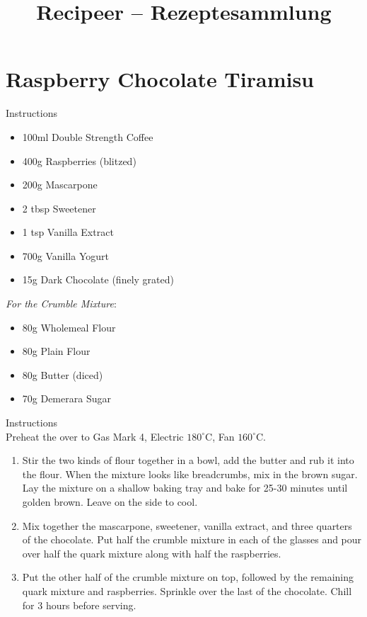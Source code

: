 \documentclass[11pt,a4paper,german]{article} %
\title{Recipeer -- Rezeptesammlung}
\begin{document}
\maketitle
\newpage

\tableofcontents

\newpage
\section{Raspberry Chocolate Tiramisu}
\lhead{}
\begin{multicols}{2}
{\Large Instructions}
\begin{itemize}
    \item 100ml Double Strength Coffee
    \item 400g Raspberries (blitzed)
    \item 200g Mascarpone
    \item 2 tbsp Sweetener
    \item 1 tsp Vanilla Extract
    \item 700g Vanilla Yogurt
    \item 15g Dark Chocolate (finely grated)
\end{itemize}
\columnbreak
\textit{For the Crumble Mixture}:
\begin{itemize}
    \item 80g Wholemeal Flour
    \item 80g Plain Flour
    \item 80g Butter (diced)
    \item 70g Demerara Sugar
\end{itemize}
\end{multicols}
{\Large Instructions}\\
Preheat the over to Gas Mark 4, Electric $180^\circ$C, Fan $160^\circ$C.
\begin{enumerate}
    \item Stir the two kinds of flour together in a bowl, add the butter and rub it into the flour. When the mixture looks like breadcrumbs, mix in the brown sugar. Lay the mixture on a shallow baking tray and bake for 25-30 minutes until golden brown. Leave on the side to cool.
    \item Mix together the mascarpone, sweetener, vanilla extract, and three quarters of the chocolate. Put half the crumble mixture in each of the glasses and pour over half the quark mixture along with half the raspberries.
    \item Put the other half of the crumble mixture on top, followed by the remaining quark mixture and raspberries. Sprinkle over the last of the chocolate. Chill for 3 hours before serving.
\end{enumerate}
\end{document}
